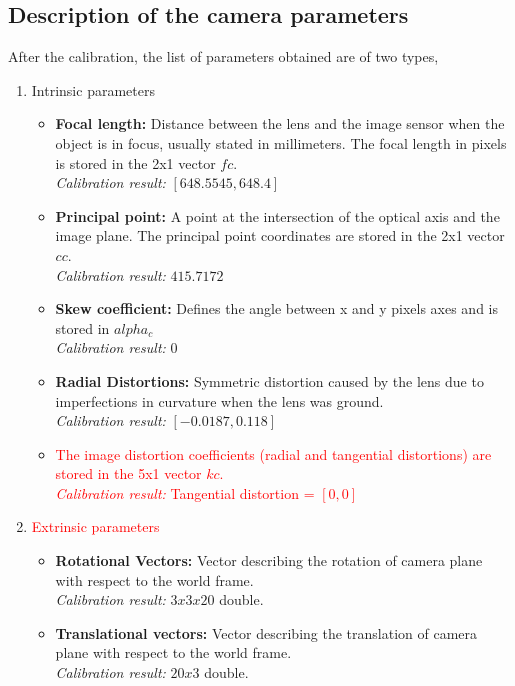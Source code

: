 \documentclass[11pt,a4paper]{article}
\begin{document}
\subsection{Description of the camera parameters}
After the calibration, the list of parameters obtained are of two types,
\begin{enumerate}
\item Intrinsic parameters
\begin{itemize}
\item \textbf{Focal length:} Distance between the lens and the image sensor when the object is in focus, usually stated in millimeters. The focal length in pixels is stored in the 2x1 vector $fc$. \\ \textit{Calibration result:} $[648.5545, 648.4]$
\item \textbf{Principal point:} A point at the intersection of the optical axis and the image plane. The principal point coordinates are stored in the 2x1 vector $cc$. \\ \textit{Calibration result:} $415.7172$
\item \textbf{Skew coefficient:} Defines the angle between x and y pixels axes and is stored in $alpha_c$ \\ \textit{Calibration result:} $0$
\item \textbf{Radial Distortions:} Symmetric distortion caused by the lens due to imperfections in curvature when the lens was ground. \\ \textit{Calibration result:} $[-0.0187, 0.118]$
\item \textcolor{red}{The image distortion coefficients (radial and tangential distortions) are stored in the 5x1 vector $kc$. \\ \textit{Calibration result:} Tangential distortion = $[0,0]$}
\end{itemize}
\item \textcolor{red}{Extrinsic parameters}
\begin{itemize}
\item \textbf{Rotational Vectors:} Vector describing the rotation of camera plane with respect to the world frame. \\ \textit{Calibration result:} $3x3x20$ double.
\item \textbf{Translational vectors:} Vector describing the translation of camera plane with respect to the world frame. \\ \textit{Calibration result:} $20x3$ double.
\end{itemize}
\end{enumerate}
\end{document}
